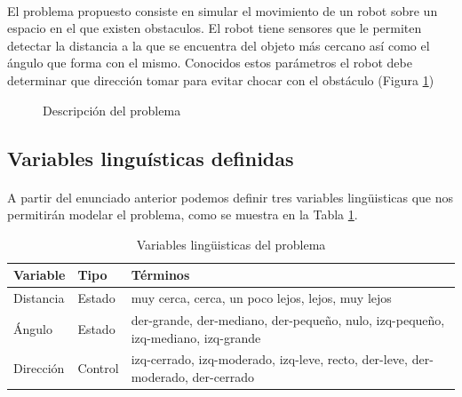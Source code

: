 \documentclass[a4paper,10pt,twocolumn]{article}
\begin{document}
  \paragraph{}   El problema propuesto consiste en simular el movimiento de un robot sobre un espacio en el que existen obstaculos.
  El robot tiene sensores que le permiten detectar la distancia a la que se encuentra del objeto más cercano así como el ángulo que forma
  con el mismo. Conocidos estos parámetros el robot debe determinar que dirección tomar para evitar chocar con el obstáculo (Figura \ref{fig:problem})
  
	\begin{figure}[htb]%
		\begin{center}
			\setlength\fboxsep{0pt}
			\setlength\fboxrule{1.5pt}
		\end{center}
		\caption{Descripción del problema \label{fig:problem}}%
	\end{figure}

\subsection{Variables linguísticas definidas}\label{sub:variables}
\paragraph{}A partir del enunciado anterior podemos definir tres variables lingüisticas que nos permitirán modelar el problema, como se muestra en la Tabla \ref{tab:lv}.

\begin{table}[htb]%
	\begin{center}
		 \begin{tabular}{| l | l | p{5.3cm} |}
			  \hline
			    Variable & Tipo & Términos \\ \hline
			    Distancia & Estado & muy cerca, cerca, un poco lejos, lejos, muy lejos \\ \hline
			    Ángulo & Estado & der-grande, der-mediano, \newline der-pequeño, nulo, izq-pequeño, izq-mediano, izq-grande \\ \hline
			    Dirección & Control & izq-cerrado, izq-moderado, \newline izq-leve, recto, der-leve, \newline der-moderado, der-cerrado \\ \hline
		  \end{tabular}		  
		  \caption{Variables lingüisticas del problema  \label{tab:lv}}%
	\end{center}
\end{table}
\end{document}
